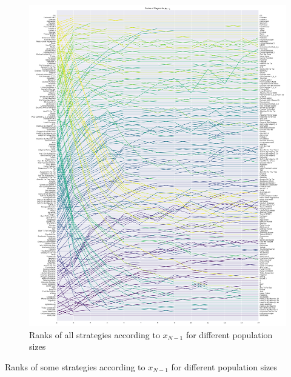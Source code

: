 \documentclass{article}
\begin{document}
\begin{figure}[!hbtp]
    \centering
    \includegraphics[height=.9\textheight]{./img/average_rank_vs_population_size_resist.pdf}
    \caption{Ranks of all strategies according to \(x_{N-1}\) for different
    population sizes}
    \label{fig:ranks_v_size_resist}
\end{figure}

\begin{table}[!hbtp]
    \centering
    \scriptsize
    
    \caption{Ranks of some strategies according to \(x_{N-1}\) for different
    population sizes}
    \label{tbl:ranks_v_size_resist}
\end{table}
\end{document}
